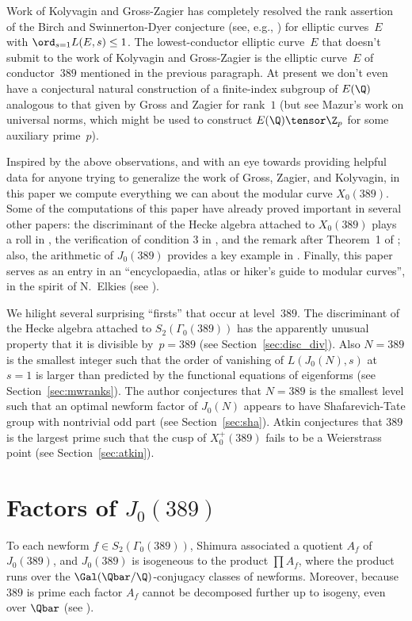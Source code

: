 \documentclass{report}
\begin{document}
Work of Kolyvagin \cite{kolyvagin:weil, kolyvagin:subclass} and
Gross-Zagier \cite{gross-zagier} has completely resolved the rank
assertion of the Birch and Swinnerton-Dyer conjecture (see, e.g.,
\cite{tate:bsd}) for elliptic curves~$E$ with $\ord_{s=1} L(E,s) \leq
1$.  The lowest-conductor elliptic curve~$E$ that doesn't submit to
the work of Kolyvagin and Gross-Zagier is the elliptic curve~$E$ of
conductor~$389$ mentioned in the previous paragraph.  At present we
don't even have a conjectural natural construction of a finite-index
subgroup of $E(\Q)$ analogous to that given by Gross and Zagier for
rank~$1$ (but see Mazur's work on universal norms, which might be used
to construct $E(\Q)\tensor\Z_p$ for some auxiliary prime~$p$).

Inspired by the above observations, and with an eye towards providing
helpful data for anyone trying to generalize the work of Gross,
Zagier, and Kolyvagin, in this paper we compute everything we can
about the modular curve $X_0(389)$.  Some of the computations of this
paper have already proved important in several other papers: the
discriminant of the Hecke algebra attached to $X_0(389)$ plays a roll
in \cite{ribet:torsion}, the verification of condition 3 in
\cite{merel-stein}, and the remark after Theorem~1 of
\cite{gordon-ono:vis}; also, the arithmetic of $J_0(389)$ provides a
key example in \cite[\S4.2]{agashe-stein:visibility}.  Finally, this
paper serves as an entry in an ``encyclopaedia, atlas or hiker's
guide to modular curves'', in the spirit of N.~Elkies
(see \cite[pg.~22]{elkies:ffield}).

We hilight several surprising ``firsts'' that occur at level~$389$.
The discriminant of the Hecke algebra attached to $S_2(\Gamma_0(389))$
has the apparently unusual property that it is divisible by~$p=389$
(see Section~\ref{sec:disc_div}).  Also $N=389$ is the smallest integer such
that the order of vanishing of $L(J_0(N),s)$ at $s=1$ is larger than
predicted by the functional equations of eigenforms (see Section~\ref{sec:mwranks}).
The author conjectures that $N=389$ is the smallest
level such that an optimal newform factor of $J_0(N)$
appears to have Shafarevich-Tate group with nontrivial odd
part (see Section~\ref{sec:sha}).
Atkin conjectures that $389$ is the largest prime such that
the cusp of $X_0^+(389)$ fails to be a
Weierstrass point (see Section~\ref{sec:atkin}).

\section{Factors of $J_0(389)$}
To each newform $f\in S_2(\Gamma_0(389))$, Shimura \cite{shimura:factors}
associated a quotient $A_f$ of $J_0(389)$, and
$J_0(389)$ is isogeneous to the  product $\prod A_f$,
where the product runs over the $\Gal(\Qbar/\Q)$-conjugacy classes of newforms.
Moreover, because $389$ is prime each factor $A_f$ cannot be decomposed further
up to isogeny, even over $\Qbar$ (see \cite{ribet:endo}).
\end{document}
